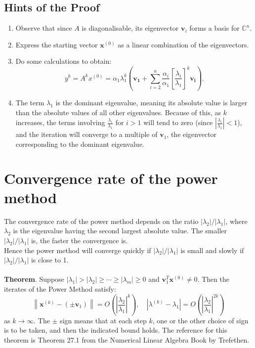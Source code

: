 \documentclass[11pt]{book}
\begin{document}
\subsection*{Hints of the Proof}
\begin{enumerate}
    \item Observe that since $A$ is diagonalisable, its eigenvector $\mathbf{v}_{i}$ forms a basis for $\mathbb{C}^{n}$.
    \item Express the starting vector $\mathbf{x}^{(0)}$ as a linear combination of the eigenvectors.
    \item Do some calculations to obtain:
           $$y^{k} = A^{k} x^{(0)}=\alpha_{1} \lambda_{1}^{k}\left(\mathbf{v}_{\mathbf{1}}+\sum_{i=2}^{n} \frac{\alpha_{i}}{\alpha_{1}}\left[\frac{\lambda_{i}}{\lambda_{1}}\right]^{k} \mathbf{v}_{\mathbf{i}}\right).$$
    \item The term $\lambda_{1}$ is the dominant eigenvalue, meaning its absolute value is larger than the absolute values of all other eigenvalues. Because of this, as $k$ increases, the terms involving $\frac{\lambda_{i}}{\lambda_{1}}$ for $i>1$ will tend to zero (since $|\frac{\lambda_{i}}{\lambda_{1}}|<1$), and the iteration will converge to a multiple of $\mathbf{v}_{1}$, the eigenvector corresponding to the dominant eigenvalue.
\end{enumerate}
\section*{Convergence rate of the power method}
The convergence rate of the power method depends on the ratio $\left|\lambda_{2}\right| /\left|\lambda_{1}\right|$, where $\lambda_{2}$ is the eigenvalue having the second largest absolute value.
The smaller $\left|\lambda_{2}\right| /\left|\lambda_{1}\right|$ is, the faster the convergence is.\\
Hence the power method will converge quickly if $\left|\lambda_{2}\right| /\left|\lambda_{1}\right|$ is small and slowly if $\left|\lambda_{2}\right| /\left|\lambda_{1}\right|$ is close to 1.\\ \\
\textbf{Theorem}. Suppose $\left|\lambda_1\right|>\left|\lambda_2\right| \geq \cdots \geq\left|\lambda_m\right| \geq 0$ and $\mathbf{v}_1^T \mathbf{x}^{(0)} \neq 0$. Then the iterates of the Power Method satisfy:
$$
\left\|\mathbf{x}^{(k)}-\left( \pm \mathbf{v}_1\right)\right\|=O\left(\left|\frac{\lambda_2}{\lambda_1}\right|^k\right), \quad\left|\lambda^{(k)}-\lambda_1\right|=O\left(\left|\frac{\lambda_2}{\lambda_1}\right|^{2 k}\right)
$$
as $k \rightarrow \infty$. The $\pm$ sign means that at each step $k$, one or the other choice of sign is to be taken, and then the indicated bound holds.
The reference for this theorem is Theorem 27.1 from the Numerical Linear Algebra Book by Trefethen.
\end{document}
